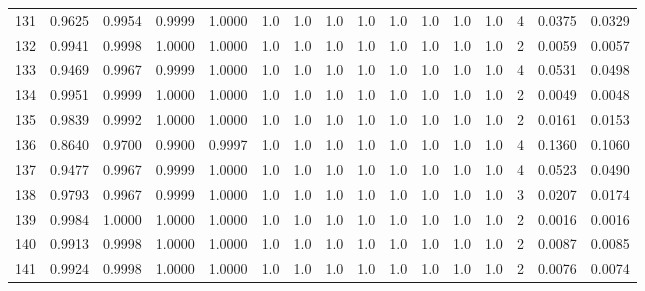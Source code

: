 \begin{tabular}{lrrrrrrrrrrrrrrr}
131 &      0.9625 &  0.9954 &  0.9999 &  1.0000 &     1.0 &     1.0 &     1.0 &     1.0 &     1.0 &     1.0 &      1.0 &        1.0 &      4 &                    0.0375 &                     0.0329 \\
132 &      0.9941 &  0.9998 &  1.0000 &  1.0000 &     1.0 &     1.0 &     1.0 &     1.0 &     1.0 &     1.0 &      1.0 &        1.0 &      2 &                    0.0059 &                     0.0057 \\
133 &      0.9469 &  0.9967 &  0.9999 &  1.0000 &     1.0 &     1.0 &     1.0 &     1.0 &     1.0 &     1.0 &      1.0 &        1.0 &      4 &                    0.0531 &                     0.0498 \\
134 &      0.9951 &  0.9999 &  1.0000 &  1.0000 &     1.0 &     1.0 &     1.0 &     1.0 &     1.0 &     1.0 &      1.0 &        1.0 &      2 &                    0.0049 &                     0.0048 \\
135 &      0.9839 &  0.9992 &  1.0000 &  1.0000 &     1.0 &     1.0 &     1.0 &     1.0 &     1.0 &     1.0 &      1.0 &        1.0 &      2 &                    0.0161 &                     0.0153 \\
136 &      0.8640 &  0.9700 &  0.9900 &  0.9997 &     1.0 &     1.0 &     1.0 &     1.0 &     1.0 &     1.0 &      1.0 &        1.0 &      4 &                    0.1360 &                     0.1060 \\
137 &      0.9477 &  0.9967 &  0.9999 &  1.0000 &     1.0 &     1.0 &     1.0 &     1.0 &     1.0 &     1.0 &      1.0 &        1.0 &      4 &                    0.0523 &                     0.0490 \\
138 &      0.9793 &  0.9967 &  0.9999 &  1.0000 &     1.0 &     1.0 &     1.0 &     1.0 &     1.0 &     1.0 &      1.0 &        1.0 &      3 &                    0.0207 &                     0.0174 \\
139 &      0.9984 &  1.0000 &  1.0000 &  1.0000 &     1.0 &     1.0 &     1.0 &     1.0 &     1.0 &     1.0 &      1.0 &        1.0 &      2 &                    0.0016 &                     0.0016 \\
140 &      0.9913 &  0.9998 &  1.0000 &  1.0000 &     1.0 &     1.0 &     1.0 &     1.0 &     1.0 &     1.0 &      1.0 &        1.0 &      2 &                    0.0087 &                     0.0085 \\
141 &      0.9924 &  0.9998 &  1.0000 &  1.0000 &     1.0 &     1.0 &     1.0 &     1.0 &     1.0 &     1.0 &      1.0 &        1.0 &      2 &                    0.0076 &                     0.0074 \\

\end{tabular}
